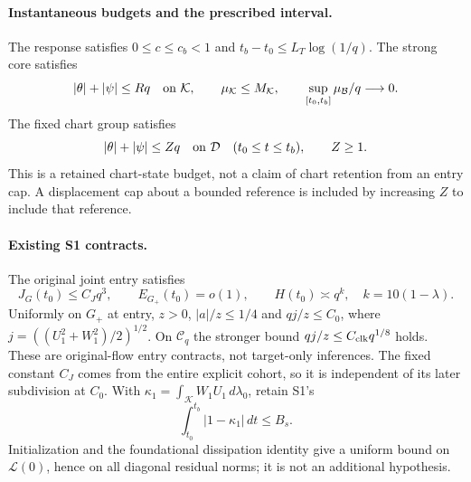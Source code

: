 \documentclass[11pt]{article}
\theoremstyle{remark}\newtheorem{remark}[theorem]{Remark}
\newcommand{\dd}{\,d}
\newcommand{\Gp}{G_+}
\newcommand{\Cl}{\mathcal C_q}
\begin{document}
\paragraph{Instantaneous budgets and the prescribed interval.}
The response satisfies $0\le c\le c_b<1$ and
$t_b-t_0\le L_T\log(1/q)$. The strong core satisfies
\begin{equation}\label{an03lcrcv1:core}
 |\theta|+|\psi|\le Rq\quad\hbox{on }\mathcal K,
 \qquad \mu_{\mathcal K}\le M_{\mathcal K},\qquad
 \sup_{[t_0,t_b]}\mu_{\mathcal B}/q\longrightarrow0.
\end{equation}
The fixed chart group satisfies
\begin{equation}\label{an03lcrcv1:chart}
 |\theta|+|\psi|\le Zq\quad\hbox{on }\mathcal D
 \quad(t_0\le t\le t_b),\qquad Z\ge1.
\end{equation}
This is a retained chart-state budget, not a claim of chart retention
from an entry cap. A displacement cap about a bounded reference
is included by increasing $Z$ to include that reference.

\paragraph{Existing S1 contracts.}
The original joint entry satisfies
\begin{equation}\label{an03lcrcv1:entry}
 J_G(t_0)\le C_Jq^3,\qquad E_{\Gp}(t_0)=o(1),\qquad
 H(t_0)\asymp q^{k},\quad k=10(1-\lambda).
\end{equation}
Uniformly on $\Gp$ at entry, $z>0$, $|a|/z\le1/4$ and
$qj/z\le C_0$, where $j=((U_1^2+W_1^2)/2)^{1/2}$.
On $\Cl$ the stronger bound $qj/z\le C_{\rm clk}q^{1/8}$ holds.
These are original-flow entry contracts, not target-only inferences.
The fixed constant $C_J$ comes from the entire explicit cohort,
so it is independent of its later subdivision at $C_0$.
With $\kappa_1=\int_{\mathcal K}W_1U_1\dd\lambda_0$, retain S1's
\begin{equation}\label{an03lcrcv1:learning}
 \int_{t_0}^{t_b}|1-\kappa_1|\dd t\le B_s.
\end{equation}
Initialization and the foundational dissipation identity give a
uniform bound on $\mathcal L(0)$, hence on all diagonal residual
norms; it is not an additional hypothesis.
\end{document}
